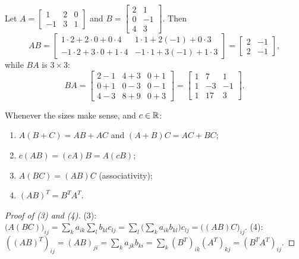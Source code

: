 \begin{example}
Let $A=\begin{bmatrix}1&2&0\\-1&3&1\end{bmatrix}$ and $B=\begin{bmatrix}2&1\\0&-1\\4&3\end{bmatrix}$. Then
\[
AB=\begin{bmatrix}1\cdot2+2\cdot0+0\cdot4 & 1\cdot1+2(-1)+0\cdot3\\
                  -1\cdot2+3\cdot0+1\cdot4 & -1\cdot1+3(-1)+1\cdot3\end{bmatrix}
  =\begin{bmatrix}2&-1\\2&-1\end{bmatrix},
\]
while $BA$ is $3\times3$:
\[
BA=\begin{bmatrix}2-1&4+3&0+1\\ 0+1&0-3&0-1\\ 4-3&8+9&0+3\end{bmatrix}
  =\begin{bmatrix}1&7&1\\1&-3&-1\\1&17&3\end{bmatrix}.
\]
\end{example}

\begin{theorem}
Whenever the sizes make sense, and $c\in\mathbb{R}$:
\begin{enumerate}
  \item $A(B+C)=AB+AC$ and $(A+B)C=AC+BC$;
  \item $c(AB)=(cA)B=A(cB)$;
  \item $A(BC)=(AB)C$ (associativity);
  \item $(AB)^T=B^TA^T$.
\end{enumerate}
\end{theorem}
\begin{proof}[Proof of (3) and (4)]
(3): $\big(A(BC)\big)_{ij}=\sum_k a_{ik}\sum_l b_{kl}c_{lj}=\sum_l\big(\sum_k a_{ik}b_{kl}\big)c_{lj}
=\big((AB)C\big)_{ij}$.
(4): $((AB)^T)_{ij}=(AB)_{ji}=\sum_k a_{jk}b_{ki}=\sum_k (B^T)_{ik}(A^T)_{kj}=(B^TA^T)_{ij}$.
\end{proof}

